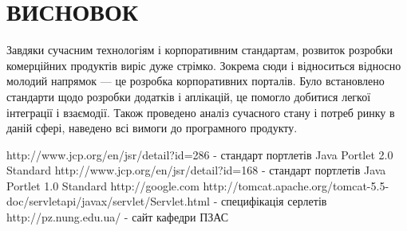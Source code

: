 \section*{ВИСНОВОК}
Завдяки сучасним технологіям і корпоративним стандартам, розвиток розробки комерційних продуктів виріс дуже стрімко. 
Зокрема сюди і відноситься відносно молодий напрямок --- це розробка корпоративних порталів. 
Було встановлено стандарти щодо розробки додатків і аплікацій, це помогло добитися легкої інтеграції і взаємодії. 
Також проведено аналіз сучасного стану і потреб ринку в даній сфері, наведено всі вимоги до програмного продукту.



\renewcommand{\refname}{ВИКОРИСТАНІ ДЖЕРЕЛА}
\begin{thebibliography}{99}
 http://www.jcp.org/en/jsr/detail?id=286 - стандарт портлетів Java Portlet 2.0 Standard 
 http://www.jcp.org/en/jsr/detail?id=168 - стандарт портлетів Java Portlet 1.0 Standard 
 http://google.com
 http://tomcat.apache.org/tomcat-5.5-doc/servletapi/javax/servlet/Servlet.html - специфікація серлетів
 http://pz.nung.edu.ua/ - сайт кафедри ПЗАС
\end{thebibliography}




